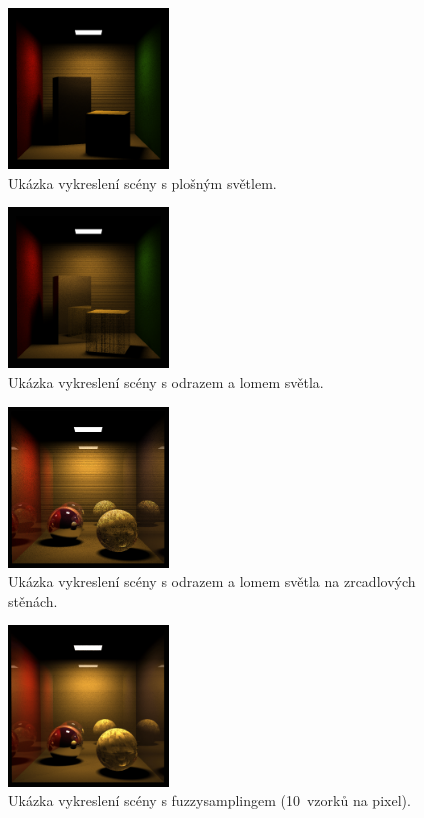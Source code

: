 \documentclass[10pt,a4paper]{article}
\begin{document}
\begin{figure}[H]
    \centering
    \includegraphics[width=0.38\textwidth]{images/box_render_area_lights.png}
    \caption{Ukázka vykreslení scény s plošným světlem.}
\end{figure}

\begin{figure}[H]
    \centering
    \includegraphics[width=0.38\textwidth]{images/box_render_reflection_refraction.png}
    \caption{Ukázka vykreslení scény s odrazem a lomem světla.}
\end{figure}

\begin{figure}[H]
    \centering
    \includegraphics[width=0.38\textwidth]{images/sphere_render_reflection_refraction_walls.png}
    \caption{Ukázka vykreslení scény s odrazem a lomem světla na zrcadlových stěnách.}
\end{figure}

\begin{figure}[H]
    \centering
    \includegraphics[width=0.38\textwidth]{images/sphere_render_sampling_10.png}
    \caption{Ukázka vykreslení scény s fuzzysamplingem (10~vzorků na pixel).}
\end{figure}
\end{document}
